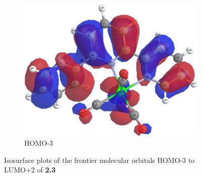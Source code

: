 \begin{figure}[!ht]
\begin{subfigure}[b]{0.31\textwidth}
  \includegraphics[clip=true, width=\textwidth, keepaspectratio]{images/mos/3h-3.eps}
  \caption{HOMO-3}
 \end{subfigure}
\caption[Molecular orbitals HOMO-3 to LUMO+2 of \textbf{2.3}]{Isosurface plots of the frontier molecular orbitals HOMO-3 to LUMO+2 of \textbf{2.3}}
\label{fig.mo23}
\end{figure} 

